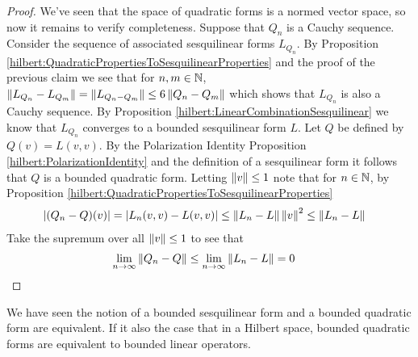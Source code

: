 \begin{proof}
We've seen that the space of quadratic forms is a normed vector space,
so now it remains to verify completeness.   Suppose that $Q_n$ is a
Cauchy sequence.   Consider the sequence of associated sesquilinear
forms $L_{Q_n}$.  By Proposition
\ref{hilbert:QuadraticPropertiesToSesquilinearProperties} and the
proof of the previous claim we see that
for $n, m \in \mathbb{N}$,  $\left \lVert L_{Q_{n}} - L_{Q_{m}} \right \rVert =
\left \lVert L_{Q_n - Q_m} \right \rVert \leq 6 \left \lVert Q_n - Q_m \right \rVert$ which shows that
$L_{Q_n}$ is also a Cauchy sequence.  By Proposition
\ref{hilbert:LinearCombinationSesquilinear} we know that $L_{Q_n}$
converges to a bounded sesquilinear form $L$.   Let $Q$ be defined
by $Q(v) = L(v,v)$.   By the Polarization Identity Proposition
\ref{hilbert:PolarizationIdentity} and the definition of a
sesquilinear form it follows that $Q$ is a bounded quadratic form.
Letting $\left \lVert v \right \rVert \leq 1$ note that for $n \in \mathbb{N}$, by Proposition
\ref{hilbert:QuadraticPropertiesToSesquilinearProperties}
\begin{align*}
  \left \vert (Q_n - Q)(v) \right \vert &= \left \vert L_n(v,v) - L(v,v) \right \vert \leq \left \lVert L_n - L \right \rVert
                       \left \lVert v \right \rVert^2  \leq \left \lVert L_n - L \right \rVert
\end{align*}
Take the supremum over all $\left \lVert v \right \rVert \leq 1$ to see that
\begin{align*}
  \lim_{n \to
  \infty} \left \lVert Q_n -  Q \right \rVert &\leq \lim_{n \to \infty} \left \lVert L_n - L \right \rVert = 0
\end{align*}
\end{proof}
                       

 We have seen the notion of a bounded sesquilinear form and a bounded quadratic form are equivalent.  If it also the case that in a Hilbert space, bounded quadratic forms are equivalent to bounded linear operators.

